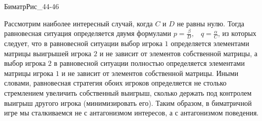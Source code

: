 \documentclass[12pt]{article}
\begin{document}
БиматрРис_44-46



Рассмотрим наиболее интересный случай, когда
$C $ и $D $ не равны нулю.  Тогда равновесная ситуация определяется
двумя формулами $ p=\frac{\beta}{D},$ \, $q=\frac{\alpha }{C}$, из которых
следует, что в равновесной ситуации выбор игрока $ 1$ определяется
элементами матрицы выигрышей игрока $ 2$ и не зависит от элементов
собственной матрицы, а выбор игрока $ 2$ в равновесной ситуации
полностью определяется элементами матрицы игрока $1 $ и не зависит от
элементов собственной матрицы. Иными словами, равновесная стратегия
обоих игроков определяется не столько стремлением увеличить
собственный выигрыш, сколько держать под контролем выигрыш другого
игрока (минимизировать его). Таким образом, в биматричной игре мы
сталкиваемся не с антагонизмом интересов, а с антагонизмом поведения.
\end{document}
